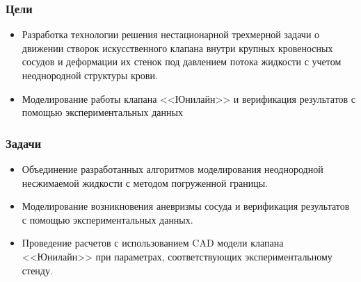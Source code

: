 \documentclass[14pt]{beamer}
\begin{document}
\begin{frame}
\frametitle{Цели}
    \begin{itemize}
        \item[\MVRightarrow] Разработка технологии решения нестационарной
            трехмерной задачи о движении створок искусственного клапана внутри
            крупных кровеносных сосудов и деформации их стенок под давлением
            потока жидкости с учетом неоднородной структуры крови.
        \item[\MVRightarrow] Моделирование работы клапана <<Юнилайн>> и
            верификация результатов с помощью экспериментальных данных
    \end{itemize}
\end{frame}

\begin{frame}
\frametitle{Задачи}
    \begin{itemize}
        \item[\MVRightarrow] Объединение разработанных алгоритмов моделирования
            неоднородной несжимаемой жидкости с методом погруженной границы.
        \item[\MVRightarrow] Моделирование возникновения аневризмы сосуда и
            верификация результатов с помощью экспериментальных данных.
        \item[\MVRightarrow] Проведение расчетов с использованием CAD модели
            клапана <<Юнилайн>> при параметрах, соответствующих экспериментальному стенду.
    \end{itemize}
\end{frame}
\end{document}
